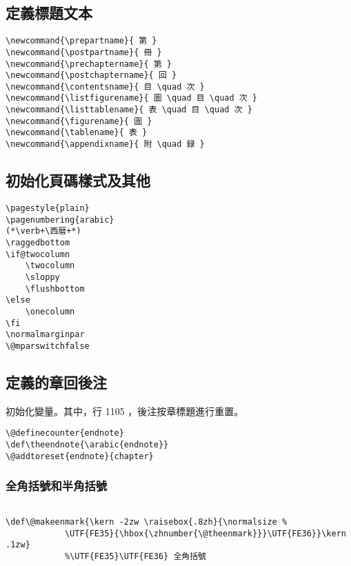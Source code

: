 \subsection{定義標題文本}

\begin{lstlisting}[firstnumber=1100]
\newcommand{\prepartname}{ 第 }
\newcommand{\postpartname}{ 冊 }
\newcommand{\prechaptername}{ 第 }
\newcommand{\postchaptername}{ 回 }
\newcommand{\contentsname}{ 目 \quad 次 }
\newcommand{\listfigurename}{ 圖 \quad 目 \quad 次 }
\newcommand{\listtablename}{ 表 \quad 目 \quad 次 }
\newcommand{\figurename}{ 圖 }
\newcommand{\tablename}{ 表 }
\newcommand{\appendixname}{ 附 \quad 録 }
\end{lstlisting}

\subsection{初始化頁碼樣式及其他}

\begin{lstlisting}[firstnumber=1110]
\pagestyle{plain}
\pagenumbering{arabic}
(*\verb+\西暦+*)
\raggedbottom
\if@twocolumn
	\twocolumn
	\sloppy
	\flushbottom
\else
	\onecolumn
\fi
\normalmarginpar
\@mparswitchfalse
\end{lstlisting}


\subsection{定義的章回後注}

\par 初始化變量。其中，行 1105 ，後注按章標題進行重置。
\begin{lstlisting}[firstnumber=1125]
\@definecounter{endnote}
\def\theendnote{\arabic{endnote}}
\@addtoreset{endnote}{chapter}
\end{lstlisting}



\subsubsection{全角括號和半角括號}

\begin{lstlisting}[firstnumber=1129]
%\def\@makeenmark{\kern -1.2zw \raisebox{.8zh}{\tiny （{\hbox{\yoko\expandafter\ajTsumesuji\expandafter*\expandafter{\number\@theenmark}}}）}}

\def\@makeenmark{\kern -2zw \raisebox{.8zh}{\normalsize %
			\UTF{FE35}{\hbox{\zhnumber{\@theenmark}}}\UTF{FE36}}\kern .1zw}
			%\UTF{FE35}\UTF{FE36} 全角括號
\end{lstlisting}



